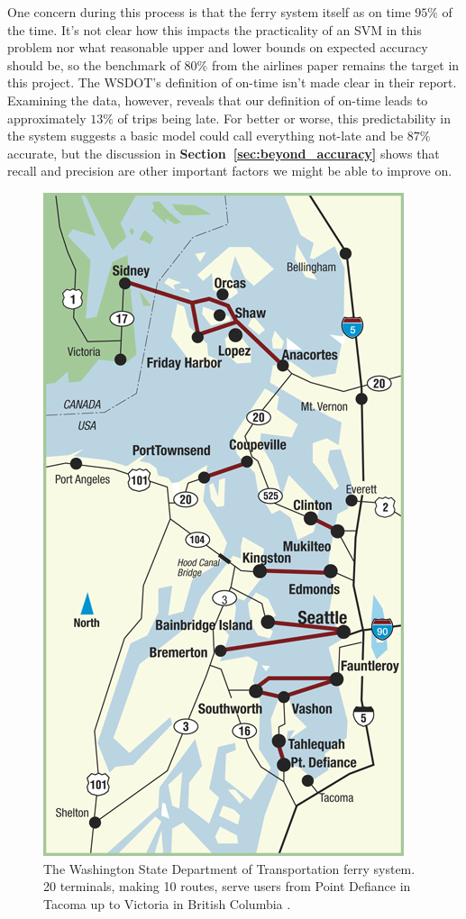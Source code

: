 \documentclass[11pt]{article} %
\begin{document}
One concern during this process is that the ferry system itself as on 
time $95\%$ of the time. It's not clear how this impacts the
practicality of an SVM in this problem nor what reasonable upper and lower bounds
on expected accuracy should be, so the benchmark of $80\%$ from the
airlines paper \cite{smith2008decision} remains the target in this project. The
WSDOT's definition of on-time isn't made clear in their report. Examining the 
data, however, reveals that our definition of on-time leads to approximately
$13\%$ of trips being late. For better or worse, this predictability in the 
system suggests a basic model could call everything not-late and be $87\%$ 
accurate, but the discussion in \textbf{Section~\ref{sec:beyond_accuracy}} 
shows that recall and precision are other important factors we might be able to 
improve on.

\begin{figure}
  \centering
  \includegraphics[scale=.4]{images/route-map-overview.png}
  \caption{The Washington State Department of Transportation ferry system. 20
  terminals, making 10 routes, serve users from Point Defiance in Tacoma up to
  Victoria in British Columbia \cite{wsdotVesselWatch}.}
  \label{fig:ferry_system}
\end{figure}
\end{document}
